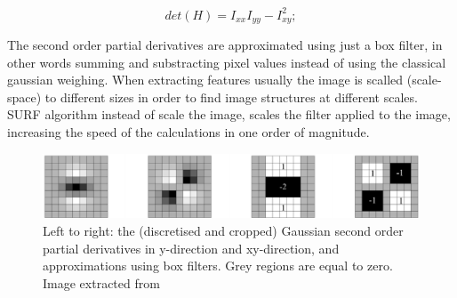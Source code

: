 $$
det(H) = I_{xx} I_{yy} - I_{xy}^2;
$$


The second order partial derivatives are approximated using just a box filter, in other words 
summing and substracting pixel values instead of using the classical gaussian weighing. 
When extracting features usually the image is scalled (scale-space) to different sizes in order 
to find image structures 
at different scales. SURF algorithm instead of scale the image, scales the filter applied to the 
image, increasing the speed of the calculations in one order of magnitude.


\begin{figure}[!h]
\begin{center}
\includegraphics[scale=0.35]{images/surf_mask}
\caption{Left to right: the (discretised and cropped) Gaussian second order partial derivatives 
in y-direction and xy-direction, and approximations using box filters. 
Grey regions are equal to zero. Image extracted from \cite{Bay06surf}}
\end{center}
\end{figure}


